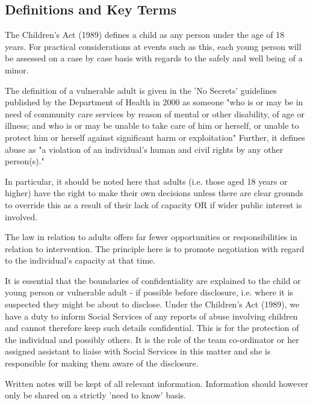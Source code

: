 \subsection{Definitions and Key Terms}

The Children's Act (1989) defines a child as any person under the age of 18
years. For practical considerations at events such as this, each young person
will be assessed on a case by case basis with regards to the safely and well
being of a minor.

The definition of a vulnerable adult is given in the 'No Secrets' guidelines
published by the Department of Health in 2000 as someone "who is or may be in
need of community care services by reason of mental or other disability, of age
or illness; and who is or may be unable to take care of him or herself, or
unable to protect him or herself against significant harm or exploitation"
Further, it defines abuse as "a violation of an individual's human and civil
rights by any other person(s)."

In particular, it should be noted here that adults (i.e. those aged 18 years or
higher) have the right to make their own decisions unless there are clear
grounds to override this as a result of their lack of capacity OR if wider
public interest is involved.

The law in relation to adults offers far fewer opportunities or
responsibilities in relation to intervention. The principle here is to promote
negotiation with regard to the individual's capacity at that time.

It is essential that the boundaries of confidentiality are explained to the
child or young person or vulnerable adult - if possible before disclosure, i.e.
where it is suspected they might be about to disclose. Under the Children's Act
(1989), we have a duty to inform Social Services of any reports of abuse
involving children and cannot therefore keep such details confidential. This is
for the protection of the individual and possibly others. It is the role of the
team co-ordinator or her assigned assistant to liaise with Social Services in
this matter and she is responsible for making them aware of the disclosure.

Written notes will be kept of all relevant information. Information should
however only be shared on a strictly 'need to know' basis.
